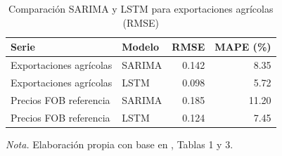 \begin{table}[H]
\centering
\caption{Comparaci\'on SARIMA y LSTM para exportaciones agr\'icolas (RMSE)}
\label{tab:sarima_lstm_rmse}
\small
\begin{tabular}{llrr}
\toprule
\textbf{Serie} & \textbf{Modelo} & \textbf{RMSE} & \textbf{MAPE (\%)} \\
\midrule
Exportaciones agr\'icolas & SARIMA & 0.142 & 8.35 \\
Exportaciones agr\'icolas & LSTM   & 0.098 & 5.72 \\
Precios FOB referencia   & SARIMA & 0.185 & 11.20 \\
Precios FOB referencia   & LSTM   & 0.124 & 7.45 \\
\bottomrule
\end{tabular}
\parbox{0.94\textwidth}{\small \textit{Nota.} Elaboraci\'on propia con base en \citep{Kurnadipare2025}, Tablas 1 y 3.}
\end{table}
